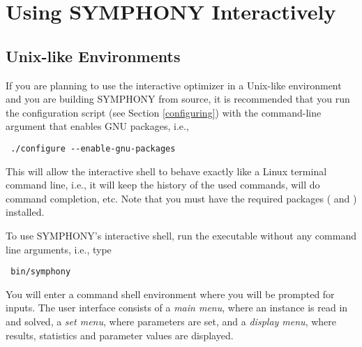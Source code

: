 
\section{Using SYMPHONY Interactively}

\subsection{Unix-like Environments}

If you are planning to use the interactive optimizer in a Unix-like
environment and you are building SYMPHONY from source, it is recommended that
you run the configuration script (see Section \ref{configuring}) with the
command-line argument that enables GNU packages, i.e., 
{\color{Brown}
\begin{verbatim}
 ./configure --enable-gnu-packages 
\end{verbatim}
} This will allow the interactive shell to behave exactly like a Linux
terminal command line, i.e., it will keep the history of the used commands,
will do command completion, etc. Note that you must have the required packages
( and ) installed.

To use SYMPHONY's interactive shell, run the executable without any
command line arguments, i.e., type 
{\color{Brown}
\begin{verbatim}
 bin/symphony 
\end{verbatim}
} You will enter a command shell environment where you will be prompted for
inputs. The user interface consists of a \emph{main menu}, where an instance
is read in and solved, a \emph{set menu}, where parameters are set, and a
\emph{display menu}, where results, statistics and parameter values are
displayed.
 
